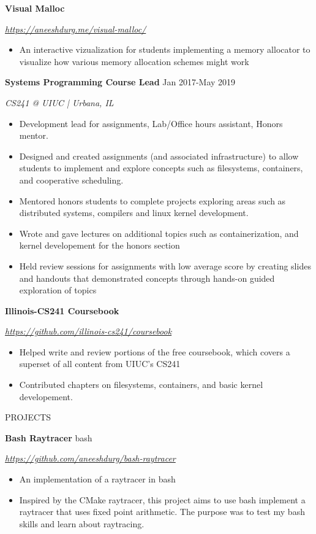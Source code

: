 \documentclass[paper=a4,fontsize=11pt]{scrartcl} %
\newcommand{\sepspace}{\vspace*{1em}}		%
\newcommand{\NewPart}[1]{ \noindent \large \usefont{OT1}{phv}{b}{n}\uppercase{#1} \normalfont \normalsize}
\newcommand{\EducationEntry}[4]{
		\noindent \textbf{#1}     %
			\hfill#2 \par  %
		\noindent \textit{#3} \par        %
		\noindent\hangafter=0 \small #4 %
		\normalsize \par}
\begin{document}
\EducationEntry{Visual Malloc}{}{\url{https://aneeshdurg.me/visual-malloc/}} {
\begin{itemize}
\item An interactive vizualization for students implementing a memory allocator to visualize how various memory allocation schemes might work
\end{itemize}
}

\EducationEntry{Systems Programming Course Lead}{Jan 2017-May 2019}{CS241 @ UIUC | Urbana, IL}{
\begin{itemize}
  \item Development lead for assignments, Lab/Office hours assistant, Honors mentor.
  \item Designed and created assignments (and associated infrastructure) to allow students to implement and explore concepts such as filesystems, containers, and cooperative scheduling.
  \item Mentored honors students to complete projects exploring areas such as distributed systems, compilers and linux kernel development.
  \item Wrote and gave lectures on additional topics such as containerization, and kernel developement for the honors section
  \item Held review sessions for assignments with low average score by creating slides and handouts that demonstrated concepts through hands-on guided exploration of topics
\end{itemize}
}

\EducationEntry{Illinois-CS241 Coursebook}{}{\url{https://github.com/illinois-cs241/coursebook}}{
\begin{itemize}
  \item Helped write and review portions of the free coursebook, which covers a superset of all content from UIUC's CS241
  \item Contributed chapters on filesystems, containers, and basic kernel developement.
\end{itemize}
}


\sepspace
\NewPart{Projects}{}
\newline
\EducationEntry{Bash Raytracer}{bash}{\url{https://github.com/aneeshdurg/bash-raytracer}}{
\begin{itemize}
\item An implementation of a raytracer in bash
\item Inspired by the CMake raytracer, this project aims to use bash implement a raytracer that uses fixed point arithmetic. The purpose was to test my bash skills and learn about raytracing.
\end{itemize}
}
\end{document}
